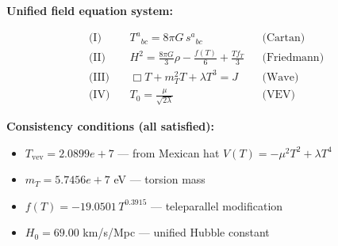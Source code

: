 
\textbf{Unified field equation system:}

\begin{align}
  \text{(I)} \quad & T^a{}_{bc} = 8\pi G \, s^a{}_{bc} && \text{(Cartan)} \\
  \text{(II)} \quad & H^2 = \frac{8\pi G}{3}\rho - \frac{f(T)}{6} + \frac{Tf_T}{3} && \text{(Friedmann)} \\
  \text{(III)} \quad & \Box T + m_T^2 T + \lambda T^3 = J && \text{(Wave)} \\
  \text{(IV)} \quad & T_0 = \frac{\mu}{\sqrt{2\lambda}} && \text{(VEV)}
\end{align}

\textbf{Consistency conditions (all satisfied):}
\begin{itemize}
  \item $T_{\text{vev}} = 2.0899e+7$ — from Mexican hat $V(T) = -\mu^2 T^2 + \lambda T^4$
  \item $m_T = 5.7456e+7$ eV — torsion mass
  \item $f(T) = -19.0501 \, T^{0.3915}$ — teleparallel modification
  \item $H_0 = 69.00$ km/s/Mpc — unified Hubble constant
\end{itemize}